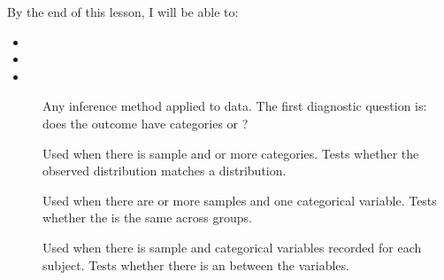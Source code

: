 \documentclass[10pt]{article}
\begin{document}
\namedateperiod

\vspace{0.10in}

\begin{objectivebox}
By the end of this lesson, I will be able to:
\begin{itemize}
  \item {}
  \item {}
  \item {}
\end{itemize}
\end{objectivebox}

\begin{vocabbox}
\begin{description}
  \item[]
        Any inference method applied to  data. The first diagnostic question is:
        does the outcome have  categories or ?

  \item[]
        Used when there is  sample and  or more categories. Tests
        whether the observed distribution matches a  distribution.

  \item[]
        Used when there are  or more  samples and one categorical
        variable. Tests whether the  is the same across groups.

  \item[]
        Used when there is  sample and  categorical variables recorded
        for each subject. Tests whether there is an  between the variables.
\end{description}
\end{vocabbox}
\end{document}
